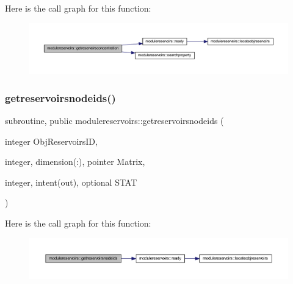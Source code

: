 Here is the call graph for this function\+:\nopagebreak
\begin{figure}[H]
\begin{center}
\leavevmode
\includegraphics[width=350pt]{namespacemodulereservoirs_af97fb114c425ea04bf826d452e6d075f_cgraph}
\end{center}
\end{figure}
\mbox{\label{namespacemodulereservoirs_a1af4820153560697135a4b5289ffefb9}} 
\subsubsection{\texorpdfstring{getreservoirsnodeids()}{getreservoirsnodeids()}}
{\footnotesize\ttfamily subroutine, public modulereservoirs\+::getreservoirsnodeids (\begin{DoxyParamCaption}\item[{integer}]{Obj\+Reservoirs\+ID,  }\item[{integer, dimension(\+:), pointer}]{Matrix,  }\item[{integer, intent(out), optional}]{S\+T\+AT }\end{DoxyParamCaption})}

Here is the call graph for this function\+:\nopagebreak
\begin{figure}[H]
\begin{center}
\leavevmode
\includegraphics[width=350pt]{namespacemodulereservoirs_a1af4820153560697135a4b5289ffefb9_cgraph}
\end{center}
\end{figure}
\mbox{\label{namespacemodulereservoirs_a53b63e6050bd055646e8d248c77b9d39}} 
